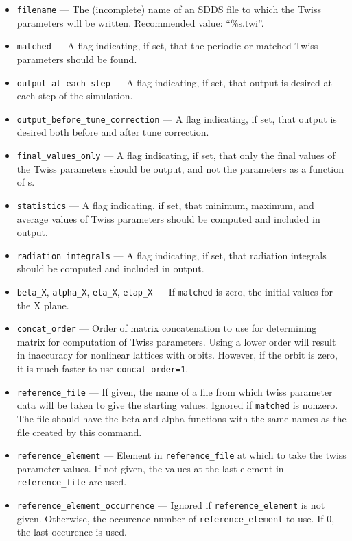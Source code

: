 \documentclass[11pt]{article}
\begin{document}
\begin{itemize}
\item \verb|filename| --- The (incomplete) name of an SDDS file to which the Twiss parameters will be written.
 Recommended value: ``\%s.twi''.
\item \verb|matched| --- A flag indicating, if set, that the periodic or matched Twiss parameters should be found.
\item \verb|output_at_each_step| --- A flag indicating, if set, that output is desired at each step of the simulation.
\item \verb|output_before_tune_correction| --- A flag indicating, if set, that output is desired both before and after
tune correction.
\item \verb|final_values_only| --- A flag indicating, if set, that only the final values of the Twiss parameters should
be output, and not the parameters as a function of s.
\item \verb|statistics| --- A flag indicating, if set, that minimum, maximum, and average values of
Twiss parameters should be computed and included in output.
\item \verb|radiation_integrals| --- A flag indicating, if set, that radiation integrals should be computed
and included in output.
\item \verb|beta_X|, \verb|alpha_X|, \verb|eta_X|, \verb|etap_X| --- If \verb|matched| is zero, the initial values for
the X plane.
\item \verb|concat_order| --- Order of matrix concatenation to use for determining matrix for
computation of Twiss parameters.  Using a lower order will result in inaccuracy for nonlinear
lattices with orbits.  However, if the orbit is zero, it is much faster to use 
\verb|concat_order=1|.
\item \verb|reference_file| --- If given, the name of a file from which twiss parameter data will
        be taken to give the starting values.  Ignored if \verb|matched| is nonzero.  The file
        should have the beta and alpha functions with the same names as the file created by
        this command.
\item \verb|reference_element| --- Element in \verb|reference_file| at which to take the
        twiss parameter values.  If not given, the values at the last element in \verb|reference_file|
        are used.
\item \verb|reference_element_occurrence| --- Ignored if \verb|reference_element| is not given.
        Otherwise, the occurence number of \verb|reference_element| to use.  If 0, the last
        occurence is used.
\end{itemize}
\end{document}
